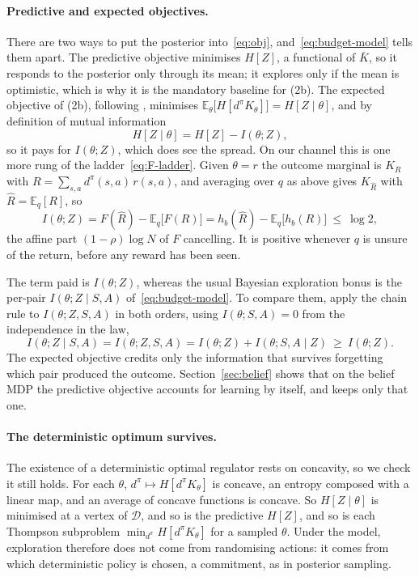 \documentclass[11pt]{article}
\theoremstyle{remark}
\newcommand{\Dcal}{\mathcal D}
\newcommand{\E}{\mathbb E}
\newcommand{\1}{\mathds{1}}
\newcommand{\occ}{d^{\pi}}
\newcommand{\Hf}[1]{H\!\left[#1\right]}
\begin{document}
\paragraph{Predictive and expected objectives.}
There are two ways to put the posterior into~\eqref{eq:obj}, and~\eqref{eq:budget-model} tells them apart.
The predictive objective minimises $\Hf{Z}$, a functional of $\bar K$, so it responds to the posterior only through its mean; it explores only if the mean is optimistic, which is why it is the mandatory baseline for (2b).
The expected objective of (2b), following \citet{Wentworth-fixing21}, minimises $\E_\theta\big[\Hf{\occ K_\theta}\big]=\Hf{Z\mid\theta}$, and by definition of mutual information
\begin{equation}
  \Hf{Z\mid\theta}=\Hf{Z}-I(\theta;Z),
  \label{eq:expected-vs-predictive}
\end{equation}
so it pays for $I(\theta;Z)$, which does see the spread.
On our channel this is one more rung of the ladder~\eqref{eq:F-ladder}.
Given $\theta=r$ the outcome marginal is $K_R$ with $R=\sum_{s,a}\occ(s,a)\,r(s,a)$, and averaging over $q$ as above gives $K_{\hat R}$ with $\hat R=\E_q[R]$, so
\begin{equation}
  I(\theta;Z)=F(\hat R)-\E_q\big[F(R)\big]=h_b(\hat R)-\E_q\big[h_b(R)\big]\ \le\ \log2,
  \label{eq:info-gain}
\end{equation}
the affine part $(1-\rho)\log N$ of $F$ cancelling.
It is positive whenever $q$ is unsure of the return, before any reward has been seen.

The term paid is $I(\theta;Z)$, whereas the usual Bayesian exploration bonus is the per-pair $I(\theta;Z\mid S,A)$ of~\eqref{eq:budget-model}.
To compare them, apply the chain rule to $I(\theta;Z,S,A)$ in both orders, using $I(\theta;S,A)=0$ from the independence in the law,
\begin{equation}
  I(\theta;Z\mid S,A)=I(\theta;Z,S,A)=I(\theta;Z)+I(\theta;S,A\mid Z)\ \ge\ I(\theta;Z).
\end{equation}
The expected objective credits only the information that survives forgetting which pair produced the outcome.
Section~\ref{sec:belief} shows that on the belief MDP the predictive objective accounts for learning by itself, and keeps only that one.

\paragraph{The deterministic optimum survives.}
The existence of a deterministic optimal regulator rests on concavity, so we check it still holds.
For each $\theta$, $\occ\mapsto\Hf{\occ K_\theta}$ is concave, an entropy composed with a linear map, and an average of concave functions is concave.
So $\Hf{Z\mid\theta}$ is minimised at a vertex of $\Dcal$, and so is the predictive $\Hf{Z}$, and so is each Thompson subproblem $\min_{\occ}\Hf{\occ K_\theta}$ for a sampled $\theta$.
Under the model, exploration therefore does not come from randomising actions: it comes from which deterministic policy is chosen, a commitment, as in posterior sampling.
\end{document}
